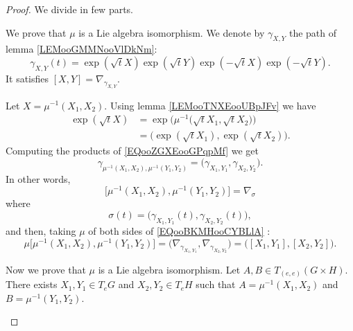 \begin{proof}

	We divide in few parts.
	\begin{subproof}


		We prove that \( \mu\) is a Lie algebra isomorphism. We denote by \( \gamma_{X,Y}\) the path of lemma \ref{LEMooGMMNooVlDkNm}:
		\begin{equation}		\label{EQooZGXEooGPqpMf}
			\gamma_{X,Y}(t)=\exp(\sqrt{ t }X)\exp(\sqrt{t}Y)\exp(-\sqrt{ t }X)\exp(-\sqrt{ t }Y).
		\end{equation}
		It satisfies \( [X,Y]=\nabla_{\gamma_{X,Y}}\).

		Let \( X=\mu^{-1}(X_1,X_2)\). Using lemma \ref{LEMooTNXEooUBpJFv} we have
		\begin{subequations}
			\begin{align}
				\exp(\sqrt{t}X) & =\exp\big( \mu^{-1}\big( \sqrt{t}X_1,\sqrt{t}X_2 \big) \big) \\
				                & =\big( \exp(\sqrt{t}X_1),\exp(\sqrt{t}X_2) \big).
			\end{align}
		\end{subequations}
		Computing the products of \eqref{EQooZGXEooGPqpMf} we get
		\begin{equation}
			\gamma_{\mu^{-1}(X_1,X_2),\mu^{-1}(Y_1,Y_2)}=\big( \gamma_{X_1,Y_1},\gamma_{X_2,Y_2} \big).
		\end{equation}
		In other words,
		\begin{equation}		\label{EQooBKMHooCYBLlA}
			\big[  \mu^{-1}(X_1,X_2),\mu^{-1}(Y_1,Y_2)  \big]=\nabla_{\sigma}
		\end{equation}
		where
		\begin{equation}
			\sigma(t)=\big( \gamma_{X_1,Y_1}(t),\gamma_{X_2,Y_2}(t) \big),
		\end{equation}
		and then, taking \( \mu\) of both sides of \eqref{EQooBKMHooCYBLlA} :
		\begin{equation}		\label{EQooSETHooGusRwa}
			\mu\big[  \mu^{-1}(X_1,X_2),\mu^{-1}(Y_1,Y_2)  \big]=\big( \nabla_{\gamma_{X_1,Y_1}},\nabla_{\gamma_{X_2,Y_2}} \big)=\big( [X_1,Y_1],[X_2,Y_2] \big).
		\end{equation}


		Now we prove that \( \mu\) is a Lie algebra isomorphism. Let \( A,B\in T_{(e,e)}(G\times H)\). There exists \( X_1,Y_1\in T_eG\) and \( X_2,Y_2\in T_eH\) such that \( A=\mu^{-1}(X_1,X_2)\) and \( B=\mu^{-1}(Y_1,Y_2)\).


\end{subproof}
\end{proof}
